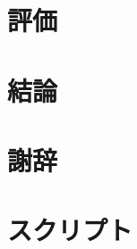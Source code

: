 \documentclass[12pt]{b-thesis}
\begin{document}
\begin{comment}
\chapter{実装}
\label{chap:implementation}

\end{comment}

\chapter{評価}
\label{chap:evaluation}


\chapter{結論}
\label{chap:conclusion}


\label{chap:thanks}
\chapter*{謝辞}


\thispagestyle{plain}



\appendix
\def\thechapter{付録\Alph{chapter}}
\chapter{スクリプト}
\label{chap:appendix}
\def\thechapter{\Alph{chapter}}

\end{document}
